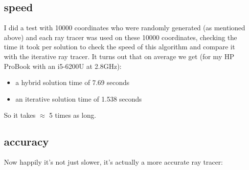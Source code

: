 \documentclass{article}
\begin{document}
\subsection{speed}
I did a test with 10000 coordinates who were randomly generated (as
mentioned above) and each ray tracer was used on these 10000 coordinates,
checking the time it took per solution to check the speed of this algorithm and
compare it with the iterative ray tracer. It turns out that on average we get
(for my HP ProBook with an i5-6200U at 2.8GHz):
\begin{itemize}
	\item a hybrid solution time of 7.69 seconds
	\item an iterative solution time of 1.538 seconds
\end{itemize}
So it takes $\approx$ 5 times as long.
\subsection{accuracy}
Now happily it's not just slower, it's actually a more accurate ray tracer:


\end{document}
